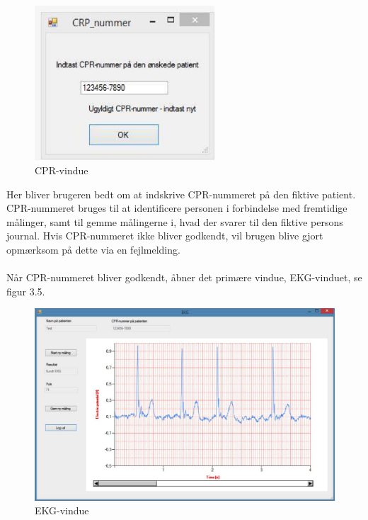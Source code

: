 \begin{figure}[H]
	\centering
	\includegraphics[width=0.6\textwidth]{Figurer/Snip20150430_39}
	\caption{CPR-vindue}
\end{figure} 

Her bliver brugeren bedt om at indskrive CPR-nummeret på den fiktive patient. CPR-nummeret bruges til at identificere personen i forbindelse med fremtidige målinger, samt til gemme målingerne i, hvad der svarer til den fiktive persons journal. Hvis CPR-nummeret ikke bliver godkendt, vil brugen blive gjort opmærksom på dette via en fejlmelding. 
\\
\\
Når CPR-nummeret bliver godkendt, åbner det primære vindue, EKG-vinduet, se figur 3.5. 

\begin{figure}[H]
	\centering
	\includegraphics[width=1.0\textwidth]{Figurer/Snip20150525_25}
	\caption{EKG-vindue}
\end{figure}

